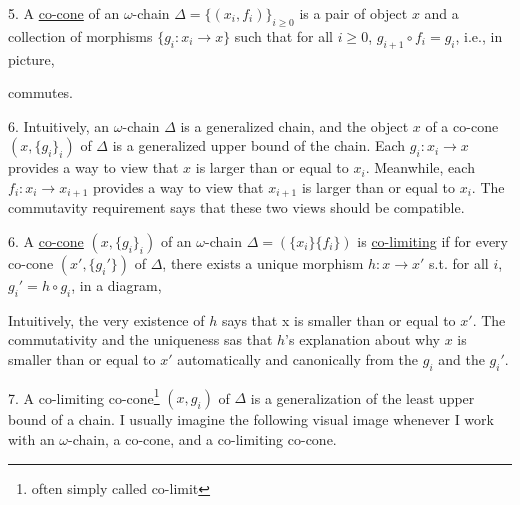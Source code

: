 \documentclass{report}[12pt]
\begin{document}
5. A \underline{co-cone} of an $\omega$-chain $\Delta = \{(x_i, f_i)\}_{i \ge 0}$ is a pair of object $x$ and a collection of morphisms $\{g_i:x_i \rightarrow x\}$ such that for all $i\ge 0$, $g_{i+1}\circ f_i = g_i$, i.e., in picture,

{\center
{}
\par}

commutes.

6. Intuitively, an $\omega$-chain $\Delta$ is a generalized chain, and the object $x$ of a co-cone $(x, \{g_i\}_i)$ of $\Delta$ is a generalized upper bound of the chain. Each $g_i:x_i \rightarrow x$ provides a way to view that $x$ is larger than or equal to $x_i$. Meanwhile, each $f_i:x_i \rightarrow x_{i+1}$ provides a way to view that $x_{i+1}$ is larger than or equal to $x_i$. The commutavity requirement says that these two views should be compatible.

6. A \underline{co-cone} $(x, \{g_i\}_i)$ of an $\omega$-chain $\Delta = (\{x_i\} \{f_i\})$ is \underline{co-limiting} if for every co-cone $(x', \{g_i'\})$ of $\Delta$, there exists a unique morphism $h:x\rightarrow x'$ s.t. for all $i$, $g_i' = h\circ g_i$, in a diagram,

{\center
{}
\par}

Intuitively, the very existence of $h$ says that x is smaller than or equal to $x'$. The commutativity and the uniqueness sas that $h$'s explanation about why $x$ is smaller than or equal to $x'$ automatically and canonically from the $g_i$ and the $g_i'$.

7. A co-limiting co-cone\footnote{often simply called co-limit} $(x, {g_i})$ of $\Delta$ is a generalization of the least upper bound of a chain. I usually imagine the following visual image whenever I work with an $\omega$-chain, a co-cone, and a co-limiting co-cone.

{\center
{}
\par}
\end{document}
